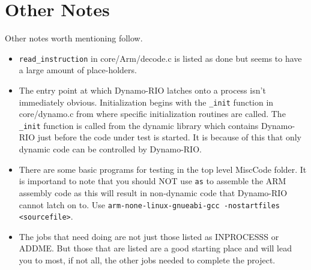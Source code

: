 \documentclass[a4paper]{article}
\begin{document}
\section{Other Notes}
Other notes worth mentioning follow.
\begin{itemize}
\item \texttt{read\_instruction} in core/Arm/decode.c is listed as done but seems to have
a large amount of place-holders.
\item The entry point at which Dynamo-RIO latches onto a process isn't immediately
obvious. Initialization begins with the \texttt{\_init} function in core/dynamo.c
from where specific initialization routines are called. The \texttt{\_init}
function is called from the dynamic library which contains Dynamo-RIO just
before the code under test is started. It is because of this that only dynamic
code can be controlled by Dynamo-RIO.
\item There are some basic programs for testing in the top level MiscCode
folder. It is importand to note that you should NOT use \texttt{as} to assemble
the ARM assembly code as this will result in non-dynamic code that Dynamo-RIO
cannot latch on to. Use \texttt{arm-none-linux-gnueabi-gcc -nostartfiles
<sourcefile>}.
\item The jobs that need doing are not just those listed as INPROCESSS or ADDME.
But those that are listed are a good starting place and will lead you to most,
if not all, the other jobs needed to complete the project.
\end{itemize}
\end{document}
